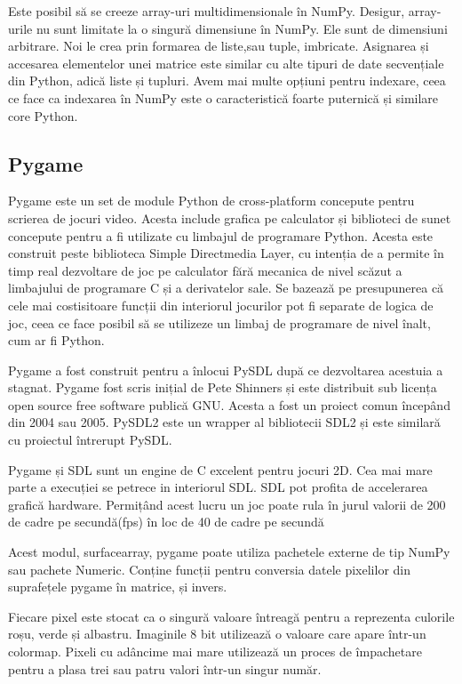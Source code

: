 Este posibil să se creeze array-uri multidimensionale în NumPy. Desigur, array-urile nu sunt limitate la o singură dimensiune în NumPy. Ele sunt de dimensiuni arbitrare. Noi le crea prin formarea de liste,sau tuple, imbricate. Asignarea și accesarea elementelor unei matrice este similar cu alte tipuri de date secvențiale din Python, adică liste și tupluri. Avem mai multe opțiuni pentru indexare, ceea ce face ca indexarea în NumPy este o caracteristică foarte puternică și similare core Python.


\subsection{Pygame}

Pygame este un set de module Python de cross-platform concepute pentru scrierea de jocuri video. Acesta include grafica pe calculator și biblioteci de sunet concepute pentru a fi utilizate cu limbajul de programare Python. Acesta este construit peste biblioteca Simple Directmedia Layer, cu intenția de a permite în timp real dezvoltare de joc pe calculator fără mecanica de nivel scăzut a limbajului de programare C și a derivatelor sale. Se bazează pe presupunerea că cele mai costisitoare funcții din interiorul jocurilor pot fi separate de logica de joc, ceea ce face posibil să se utilizeze un limbaj de programare de nivel înalt, cum ar fi Python.

Pygame a fost construit pentru a înlocui PySDL după ce dezvoltarea acestuia a stagnat. Pygame fost scris inițial de Pete Shinners și este distribuit sub licența open source free software publică GNU. Acesta a fost un proiect comun începând din 2004 sau 2005. PySDL2 este un wrapper al bibliotecii SDL2 și este similară cu proiectul întrerupt PySDL.

Pygame și SDL sunt un engine de C excelent pentru jocuri 2D. Cea mai mare parte a execuției se petrece in interiorul SDL. SDL pot profita de accelerarea grafică hardware. Permițând acest lucru un joc poate rula în jurul valorii de 200 de cadre pe secundă(fps) în loc de 40 de cadre pe secundă

Acest modul, surfacearray, pygame poate utiliza pachetele externe de tip NumPy sau pachete Numeric. Conține funcții pentru conversia datele pixelilor din suprafețele pygame în matrice, și invers.

Fiecare pixel este stocat ca o singură valoare întreagă pentru a reprezenta culorile roșu, verde și albastru. Imaginile 8 bit utilizează o valoare care apare într-un colormap. Pixeli cu adâncime mai mare utilizează un proces de împachetare pentru a plasa trei sau patru valori într-un singur număr.

